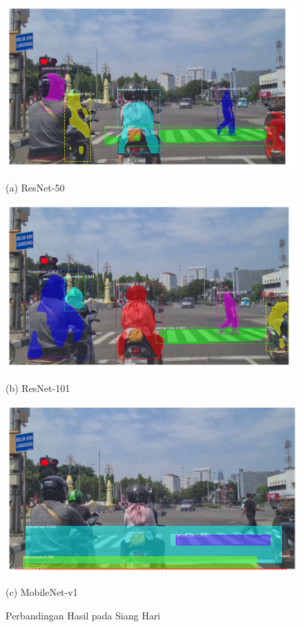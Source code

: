 \begin{figure}[!h]
	\centering
	\begin{minipage}[b]{0.3\textwidth}
		\includegraphics[width=\textwidth]{gambar/siang-frame465-resnet50.png}
		\caption*{(a) ResNet-50}
	\end{minipage}
	\hfill
	\begin{minipage}[b]{0.3\textwidth}
		\includegraphics[width=\textwidth]{gambar/siang-frame465-resnet101.png}
		\caption*{(b) ResNet-101}
	\end{minipage}
	\hfill
	\begin{minipage}[b]{0.3\textwidth}
		\includegraphics[width=\textwidth]{gambar/siang-frame465-mobilenetv1.png}
		\caption*{(c) MobileNet-v1}
	\end{minipage}
	\caption{{Perbandingan Hasil pada Siang Hari}}
	\label{fig:comparasion-afternoon}
\end{figure}

